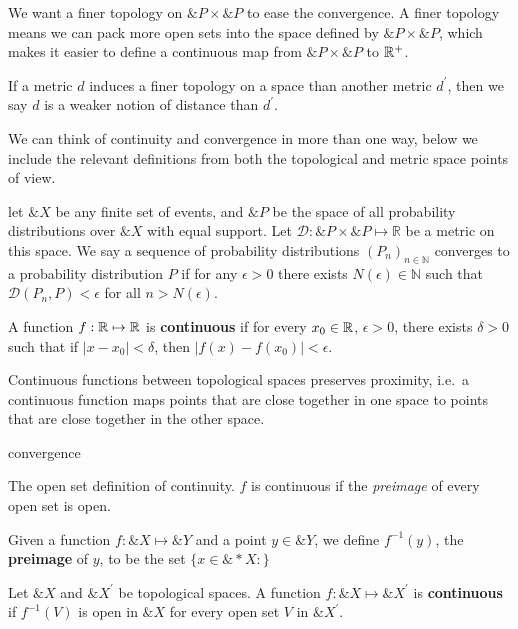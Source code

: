 We want a finer topology on $\&P \times \&P$ to ease the convergence.
A finer topology means we can pack more open sets into the space
defined by $\&P \times \&P$, which makes it easier to define a
continuous map from $\&P \times \&P$ to $\mathbb{R}^+$.

If a metric $d$ induces a finer topology on a space than another
metric $d^\prime$, then we say $d$ is a weaker notion of distance than
$d^\prime$.

We can think of continuity and convergence in more than one way, below
we include the relevant definitions from both the topological and
metric space points of view.

\begin{definition}
  let $\&X$ be any finite set of events, and $\&P$ be the space of all
  probability distributions over $\&X$ with equal support. Let
  $\mathcal{D}: \&P \times \&P \mapsto \mathbb{R}$ be a metric on this
  space. We say a sequence of probability distributions
  $(P_n)_{n \in \mathbb{N}}$ converges to a probability distribution
  $P$ if for any $\epsilon > 0$ there exists
  $N(\epsilon) \in \mathbb{N}$ such that
  $\mathcal{D}(P_n,P) < \epsilon$ for all $n > N(\epsilon)$.
\end{definition}

\begin{definition}
  A function $f: \mathbb{R} \mapsto \mathbb{R}$ is \textbf{continuous} if for every
  $x_0 \in \mathbb{R}$, $\epsilon > 0$, there exists $\delta > 0$ such that if
  $|x - x_0| < \delta$, then $|f(x) - f(x_0)| < \epsilon$.
\end{definition}

Continuous functions between topological spaces preserves proximity,
i.e.\ a continuous function maps points that are close together in one
space to points that are close together in the other space.

\begin{definition}
  convergence
\end{definition}

The open set definition of continuity.  $f$ is continuous if the
\textit{preimage} of every open set is open.

\begin{definition}
  Given a function $f: \&X \mapsto \&Y$ and a point $y \in \&Y$, we
  define $f^{-1}(y)$, the \textbf{preimage} of $y$, to be the set $\{x
  \in \&*X : \}$
\end{definition}

\begin{definition}
  Let $\&X$ and $\&X^\prime$ be topological spaces.  A function
  $f: \&X \mapsto \&X^\prime$ is \textbf{continuous} if $f^{-1}(V)$ is
  open in $\&X$ for every open set $V$ in $\&X^\prime$.
\end{definition}

